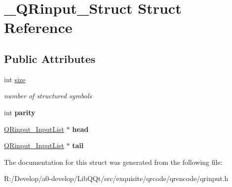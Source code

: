 \hypertarget{struct___q_rinput___struct}{}\section{\+\_\+\+Q\+Rinput\+\_\+\+Struct Struct Reference}
\label{struct___q_rinput___struct}
\subsection*{Public Attributes}
\begin{DoxyCompactItemize}
\item 
\mbox{\label{struct___q_rinput___struct_ae1b68ea889ffbcf415ed531f54bd189e}} 
int \mbox{\hyperlink{struct___q_rinput___struct_ae1b68ea889ffbcf415ed531f54bd189e}{size}}
\begin{DoxyCompactList}\small\item\em number of structured symbols \end{DoxyCompactList}\item 
\mbox{\label{struct___q_rinput___struct_a5877234dae241a78499e164b33fb4fcb}} 
int {\bfseries parity}
\item 
\mbox{\label{struct___q_rinput___struct_a14a237b726b7aad7dcaaccff2a864b5f}} 
\mbox{\hyperlink{struct___q_rinput___input_list}{Q\+Rinput\+\_\+\+Input\+List}} $\ast$ {\bfseries head}
\item 
\mbox{\label{struct___q_rinput___struct_a38368e551a8aa90156aceae525c512bb}} 
\mbox{\hyperlink{struct___q_rinput___input_list}{Q\+Rinput\+\_\+\+Input\+List}} $\ast$ {\bfseries tail}
\end{DoxyCompactItemize}


The documentation for this struct was generated from the following file\+:\begin{DoxyCompactItemize}
\item 
R\+:/\+Develop/a0-\/develop/\+Lib\+Q\+Qt/src/exquisite/qrcode/qrencode/qrinput.\+h\end{DoxyCompactItemize}
